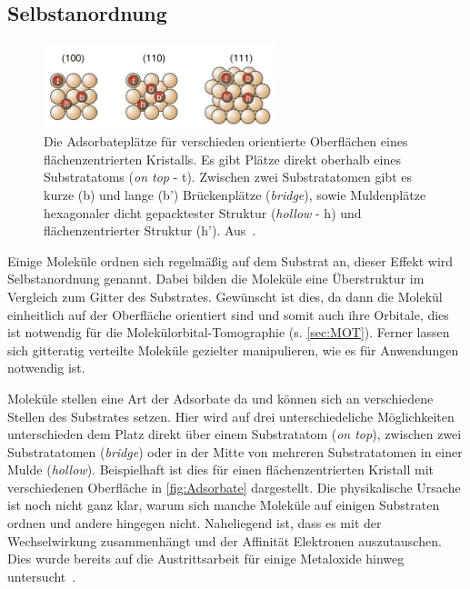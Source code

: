         \subsection{Selbstanordnung}
            \begin{figure}
                \centering
                \includegraphics[width=0.6\textwidth]{Adsorbate}
                \caption{Die Adsorbateplätze für verschieden orientierte Oberflächen eines flächenzentrierten Kristalls.
                Es gibt Plätze direkt oberhalb eines Substratatoms (\textit{on top} - t).
                Zwischen zwei Substratatomen gibt es kurze (b) und lange (b') Brückenplätze (\textit{bridge}), sowie Muldenplätze hexagonaler dicht gepacktester Struktur (\textit{hollow} - h) und flächenzentrierter Struktur (h'). Aus~\cite{Fauster}.}
                \label{fig:Adsorbate}
            \end{figure}
            Einige Moleküle ordnen sich regelmäßig auf dem Substrat an, dieser Effekt wird Selbstanordnung genannt.
            Dabei bilden die Moleküle eine Überstruktur im Vergleich zum Gitter des Substrates.
            Gewünscht ist dies, da dann die Molekül einheitlich auf der Oberfläche orientiert sind und somit auch ihre Orbitale, dies ist notwendig für die Molekülorbital-Tomographie (s. \autoref{sec:MOT}).
            Ferner lassen sich gitteratig verteilte Moleküle gezielter manipulieren, wie es für Anwendungen notwendig ist.
            
            Moleküle stellen eine Art der Adsorbate da und können sich an verschiedene Stellen des Substrates setzen.
            Hier wird auf drei unterschiedeliche Möglichkeiten unterschieden dem Platz direkt über einem Substratatom (\textit{on top}), zwischen zwei Substratatomen (\textit{bridge}) oder in der Mitte von mehreren Substratatomen in einer Mulde (\textit{hollow}).
            Beispielhaft ist dies für einen flächenzentrierten Kristall mit verschiedenen Oberfläche in \autoref{fig:Adsorbate} dargestellt.
            Die physikalische Ursache ist noch nicht ganz klar, warum sich manche Moleküle auf einigen Substraten ordnen und andere hingegen nicht.
            Naheliegend ist, dass es mit der Wechselwirkung zusammenhängt und der Affinität Elektronen auszutauschen.
            Dies wurde bereits auf die Austrittsarbeit für einige Metaloxide hinweg untersucht~\cite{greiner_universal_2012}.

